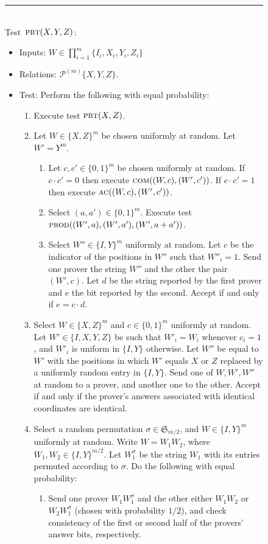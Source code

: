 \documentclass[11pt]{article}
\numberwithin{equation}{section}
\theoremstyle{definition}
\theoremstyle{plain}
\newcommand{\pbt}{\textsc{pbt}}
\newcommand{\prodt}{\textsc{prod}}
\newcommand{\comt}{\textsc{com}}
\newcommand{\act}{\textsc{ac}}
\newcommand{\paulin}{\mathcal{P}^{(m)}\!}
\begin{document}
\begin{figure}[H]
\rule[1ex]{\textwidth}{0.5pt}\\
\justifying
Test~$\pbt(X,Y,Z)$: 
\begin{itemize}
\item Inputs: $W\in\prod_{i=1}^m\{I_i,X_i,Y_i,Z_i\}$
\item Relations: $\paulin\{X,Y,Z\}$.  
\item Test: Perform the following with equal probability: 
\begin{enumerate}
\item[(a)] Execute test $\pbt(X,Z)$. 
\item[(b)] Let $W\in\{X,Z\}^m$ be chosen uniformly at random. Let $W'=Y^m$. 
\begin{enumerate}
\item[(i)] Let $c,c'\in\{0,1\}^m$ be chosen uniformly at random. If $c\cdot c'=0$ then execute $\comt((W,c),(W',c'))$. If $c\cdot c'=1$ then execute $\act((W,c),(W',c'))$. 
\item[(ii)]  Select $(a,a')\in\{0,1\}^m$. Execute test $\prodt((W',a),(W',a'),(W',a+a'))$. 
\item[(iii)] Select $W''\in\{I,Y\}^m$ uniformly at random. Let $c$ be the indicator of the positions in $W''$ such that $W''_i=1$. Send one prover the string $W''$ and the other the pair $(W',c)$. Let $d$ be the string reported by the first prover and $e$ the bit reported by the second. Accept if and only if $e=c\cdot d$. 
\end{enumerate}
\item[(c)] Select $W\in\{X,Z\}^m$ and $c\in\{0,1\}^m$ uniformly at random. Let $W'\in\{I,X,Y,Z\}$ be such that $W'_i=W_i$ whenever $c_i=1$, and $W'_i$ is uniform in $\{I,Y\}$ otherwise. Let $W''$ be equal to $W'$ with the positions in which $W'$ equals $X$ or $Z$ replaced by a uniformly random entry in $\{I,Y\}$. Send one of $W,W',W''$ at random to a prover, and another one to the other. Accept if and only if the prover's answers associated with identical coordinates are identical. 
\item[(d)] Select a random permutation  $\sigma \in \mathfrak{S}_{m/2}$, and $W\in  \{I,Y\}^m$ uniformly at random. Write $W=W_1 W_2$, where $W_1,W_2\in \{I,Y\}^{m/2}$. Let $W_1^\sigma$ be the string $W_1$ with its entries permuted according to $\sigma$. Do the following with equal probability: 
\begin{enumerate}
\item[(i)] Send one prover $W_1 W_1^\sigma$ and the other either $W_1 W_2$ or $W_2W_1^\sigma$ (chosen with probability $1/2$), and check consistency of the first or second half of the provers' answer bits, respectively.

\end{enumerate}
\end{enumerate}
\end{itemize}
\end{figure}
\end{document}
